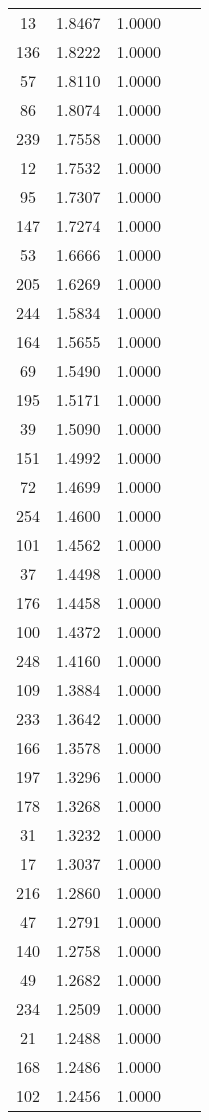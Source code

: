 \documentclass[12pt]{article}\usepackage[]{graphicx}\usepackage[]{color}
\begin{document}
\begin{longtable}[c]{ccccc}
	13	& 1.8467 & 1.0000 & & \\
	136	& 1.8222 & 1.0000 & & \\
	57	& 1.8110 & 1.0000 & & \\
	86	& 1.8074 & 1.0000 & & \\
	239	& 1.7558 & 1.0000 & & \\
	12	& 1.7532 & 1.0000 & & \\
	95	& 1.7307 & 1.0000 & & \\
	147	& 1.7274 & 1.0000 & & \\
	53	& 1.6666 & 1.0000 & & \\
	205	& 1.6269 & 1.0000 & & \\
	244	& 1.5834 & 1.0000 & & \\
	164	& 1.5655 & 1.0000 & & \\
	69	& 1.5490 & 1.0000 & & \\
	195	& 1.5171 & 1.0000 & & \\
	39	& 1.5090 & 1.0000 & & \\
	151	& 1.4992 & 1.0000 & & \\
	72	& 1.4699 & 1.0000 & & \\
	254	& 1.4600 & 1.0000 & & \\
	101	& 1.4562 & 1.0000 & & \\
	37	& 1.4498 & 1.0000 & & \\
	176	& 1.4458 & 1.0000 & & \\
	100	& 1.4372 & 1.0000 & & \\
	248	& 1.4160 & 1.0000 & & \\
	109	& 1.3884 & 1.0000 & & \\
	233	& 1.3642 & 1.0000 & & \\
	166	& 1.3578 & 1.0000 & & \\
	197	& 1.3296 & 1.0000 & & \\
	178	& 1.3268 & 1.0000 & & \\
	31	& 1.3232 & 1.0000 & & \\
	17	& 1.3037 & 1.0000 & & \\
	216	& 1.2860 & 1.0000 & & \\
	47	& 1.2791 & 1.0000 & & \\
	140	& 1.2758 & 1.0000 & & \\
	49	& 1.2682 & 1.0000 & & \\
	234	& 1.2509 & 1.0000 & & \\
	21	& 1.2488 & 1.0000 & & \\
	168	& 1.2486 & 1.0000 & & \\
	102	& 1.2456 & 1.0000 & & \\

\end{longtable}
\end{document}
